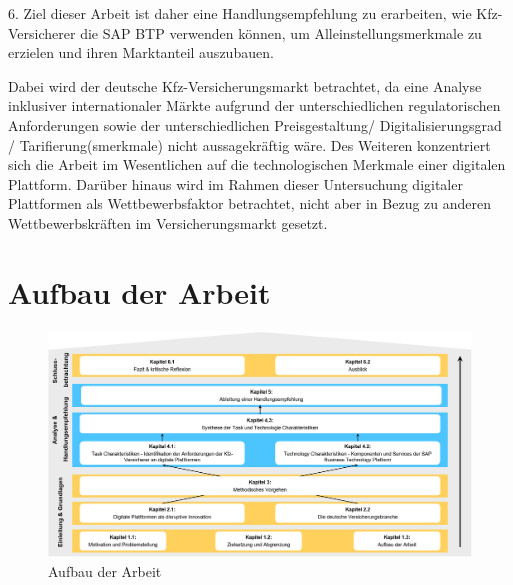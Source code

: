 6. Ziel dieser Arbeit ist daher eine Handlungsempfehlung zu erarbeiten, wie Kfz-Versicherer die SAP BTP verwenden können, um Alleinstellungsmerkmale zu erzielen und ihren Marktanteil auszubauen.


Dabei wird der deutsche Kfz-Versicherungsmarkt betrachtet, da eine Analyse inklusiver internationaler Märkte aufgrund der unterschiedlichen regulatorischen Anforderungen sowie der unterschiedlichen Preisgestaltung/ Digitalisierungsgrad / Tarifierung(smerkmale) nicht aussagekräftig wäre. Des Weiteren konzentriert sich die Arbeit im Wesentlichen auf die technologischen Merkmale einer digitalen Plattform. Darüber hinaus wird im Rahmen dieser Untersuchung digitaler Plattformen als Wettbewerbsfaktor betrachtet, nicht aber in Bezug zu anderen Wettbewerbskräften im Versicherungsmarkt gesetzt.

\newpage
\section{Aufbau der Arbeit}

\begin{figure}[h]
    \centering
    \includegraphics[width=1\textwidth]{img/Aufbau_der_Arbeit.jpg}
    \caption[Aufbau der Arbeit]{Aufbau der Arbeit\autocite{Aufbau}}
    \label{fig:Aufbau}
\end{figure}


\newpage
